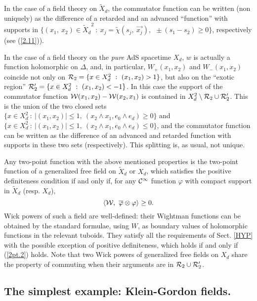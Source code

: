 \documentclass[a4paper,a4paper]{article}
\def\RR{\mathbb R}
\def\CC{{\cal C}}
\def\RR{{\cal R}}
\def\WW{{\cal W}}
\def\wt{\widetilde}
\def\ovl{\overline}
\def \vhi{\varphi}
\def\wXd{{\wt X_d}}
\begin{document}
In the case of a field theory on $\wXd$, the commutator function
can be written (non uniquely) as the difference of
a retarded and an advanced ``function'' with supports in
$\{(x_1,\ x_2) \in \wXd^2\ :\ x_j = \wt \chi(s_j,\ \vec{x_j}),\ \
\pm(s_1-s_2) \ge 0\}$, respectively (see (\ref{2.11})).

In the case of a field theory on
the {\sl pure} AdS spacetime $X_d$, $w$ is actually a function
holomorphic on $\Delta$, and, in particular,
$W_+(x_1,x_2)$ and
$W_-(x_1,x_2)$
coincide not only on
$\RR_2 = \{x \in X_d^2\ :\ (x_1,x_2) > 1\}$,
but also on the ``exotic region''
$\RR'_2 = \{x \in X_d^2\ :\ (x_1,x_2) < -1\}$.
In this case the support of
the commutator function $\WW(x_1,x_2) - \WW(x_2,x_1)$ is
contained in $X_d^2 \setminus \RR_2\cup\RR'_2$.
This is the union of the two closed sets
$\{x \in X_d^2\ :\ |(x_1,x_2)| \le 1,\
(x_2\wedge x_1, e_0\wedge e_d) \ge 0\}$
and $\{x \in X_d^2\ :\ |(x_1,x_2)| \le 1,\
(x_2\wedge x_1, e_0\wedge e_d) \le 0\}$,
and the commutator function can be written as the difference
of an advanced and retarded function with supports in these two
sets (respectively). This splitting is, as usual, not unique.

Any two-point function with the above mentioned properties
is the two-point function of a generalized free field on $\wXd$ or $X_d$,
which satisfies the positive definiteness condition if and only
if, for any $\CC^\infty$ function $\vhi$ with compact support in $\wXd$
(resp. $X_d$),
\begin{equation}
\langle \WW,\ \ovl\vhi \otimes \vhi \rangle \ge 0.
\label{2pt.2}\end{equation}
Wick powers
of such a field are well-defined: their Wightman functions
can be obtained by the standard formulae, using $W$, as
boundary values of holomorphic functions in the relevant tuboids.
They satisfy all the requirements of Sect. \ref{HYP} with the possible
exception of positive definiteness, which holds if and only if
(\ref{2pt.2}) holds. Note that two Wick powers of generalized free
fields on $X_d$ share the property of commuting when their arguments
are in $\RR_2\cup\RR'_2$.

\subsection{The simplest example: Klein-Gordon fields.}
\end{document}
